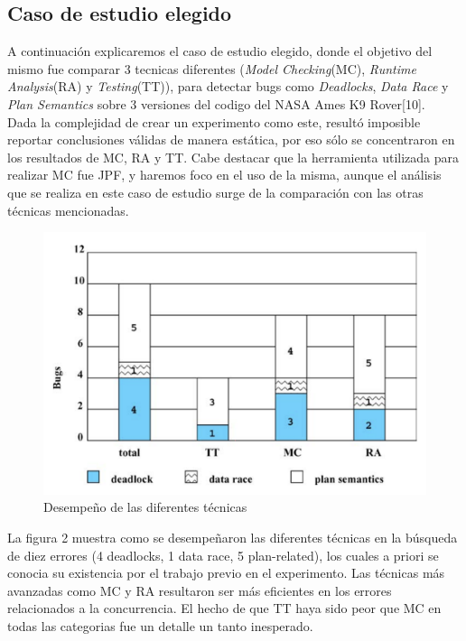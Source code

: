 \documentclass[runningheads]{llncs}
\begin{document}
\subsection{Caso de estudio elegido}
A continuaci\'on explicaremos el caso de estudio elegido, donde el objetivo del mismo fue comparar 3 tecnicas diferentes (\textit{Model Checking}(MC), \textit{Runtime Analysis}(RA) y \textit{Testing}(TT)), para detectar bugs como \textit{Deadlocks}, \textit{Data Race} y \textit{Plan Semantics} sobre 3 versiones del codigo del NASA Ames K9 Rover[10].\\
Dada la complejidad de crear un experimento como este, result\'o imposible reportar conclusiones v\'alidas de manera est\'atica, por eso s\'olo se concentraron en los resultados de MC, RA y TT. Cabe destacar que la herramienta utilizada para realizar MC fue JPF, y haremos foco en el uso de la misma, aunque el an\'alisis que se realiza en este caso de estudio surge de la comparaci\'on con las otras t\'ecnicas mencionadas.

\begin{figure}[H]
\centering
\includegraphics[scale=0.33]{fig2.png}
\caption{Desempe\~no de las diferentes t\'ecnicas} \label{fig2}
\end{figure}
La figura 2 muestra como se desempe\~naron las diferentes t\'ecnicas en la b\'usqueda de diez errores (4 deadlocks, 1 data race, 5 plan-related), los cuales a priori se conocia su existencia por el trabajo previo en el experimento. Las t\'ecnicas m\'as avanzadas como MC y RA resultaron ser m\'as eficientes en los errores relacionados a la concurrencia. El hecho de que TT haya sido peor que MC en todas las categorias fue un detalle un tanto inesperado.\\
\end{document}
